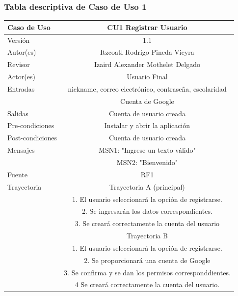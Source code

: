 \documentclass{article}
\begin{document}
\subsubsection{Tabla descriptiva de Caso de Uso 1}
\begin{tabular}{|M{5cm}|c|}
\hline
Caso de Uso & CU1 Registrar Usuario\\ \hline
Versión & 1.1\\ \hline
Autor(es) & Itzcoatl Rodrigo Pineda Vieyra\\ \hline
Revisor & Izaird Alexander Mothelet Delgado \\ \hline
Actor(es) & Usuario Final \\ \hline
Entradas & nickname, correo electrónico, contraseña, escolaridad\\ & Cuenta de Google \\ \hline
Salidas & Cuenta de usuario creada \\ \hline
Pre-condiciones & Instalar y abrir la aplicación \\ \hline
Post-condiciones & Cuenta de usuario creada\\ \hline
Mensajes & MSN1: "Ingrese un texto válido"\\
		 & MSN2: "Bienvenido"\\ \hline
Fuente & RF1 \\ \hline	
	Trayectoria & Trayectoria A (principal)\\
		& 1.   El usuario seleccionará la opción de registrarse.\\
		& 2.   Se ingresarán los datos correspondientes.\\
		& 3.   Se creará correctamente la cuenta del usuario\\
	& Trayectoria B\\
	& 1.   El usuario seleccionará la opción de registrarse.\\
	& 2.   Se proporcionará una cuenta de Google\\
	& 3.   Se confirma y se dan los permisos corresponddientes.\\
	& 4   Se creará correctamente la cuenta del usuario.\\ \hline
\end{tabular}
\end{document}
